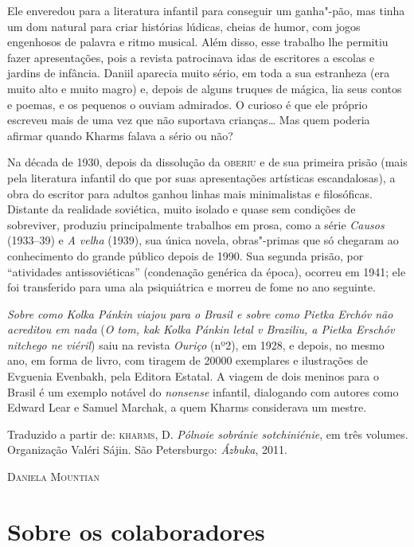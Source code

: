 Ele enveredou para a literatura infantil para conseguir um ganha"-pão,
mas tinha um dom natural para criar histórias lúdicas, cheias de humor,
com jogos engenhosos de palavra e ritmo musical. Além disso, esse
trabalho lhe permitiu fazer apresentações, pois a revista patrocinava
idas de escritores a escolas e jardins de infância. Daniil aparecia
muito sério, em toda a sua estranheza (era muito alto e muito magro) e,
depois de alguns truques de mágica, lia seus contos e poemas, e os
pequenos o ouviam admirados. O curioso é que ele próprio escreveu mais
de uma vez que não suportava crianças\ldots{} Mas quem poderia afirmar quando
Kharms falava a sério ou não?

Na década de 1930, depois da dissolução da \textsc{oberiu} e de sua primeira
prisão (mais pela literatura infantil do que por suas apresentações
artísticas escandalosas), a obra do escritor para adultos ganhou linhas
mais minimalistas e filosóficas. Distante da realidade soviética, muito
isolado e quase sem condições de sobreviver, produziu principalmente
trabalhos em prosa, como a série \emph{Causos} (1933--39) e \emph{A
velha} (1939), sua única novela, obras"-primas que só chegaram ao
conhecimento do grande público depois de 1990. Sua segunda prisão, por
``atividades antissoviéticas'' (condenação genérica da época), ocorreu
em 1941; ele foi transferido para uma ala psiquiátrica e morreu de fome
no ano seguinte.

\emph{Sobre como Kolka Pánkin viajou para o Brasil e sobre como Pietka
Erchóv não acreditou em nada} (\emph{O tom, kak Kolka Pánkin letal v
Braziliu, a Pietka Erschóv nitchego ne viéril}) saiu na revista
\emph{Ouriço} (nº2), em 1928, e depois, no mesmo ano, em forma de livro,
com tiragem de 20000 exemplares e ilustrações de Evguenia Evenbakh, pela
Editora Estatal. A viagem de dois meninos para o Brasil é um exemplo
notável do \emph{nonsense} infantil, dialogando com autores como
Edward Lear e Samuel Marchak, a quem Kharms considerava um mestre.

Traduzido a partir de:
\textsc{kharms}, D. \emph{Pólnoie sobránie sotchiniénie}, em três volumes.
Organização Valéri Sájin. São Petersburgo: \emph{Ázbuka}, 2011.

\bigskip

\noindent\textsc{Daniela Mountian}

\chapter{Sobre os colaboradores}


